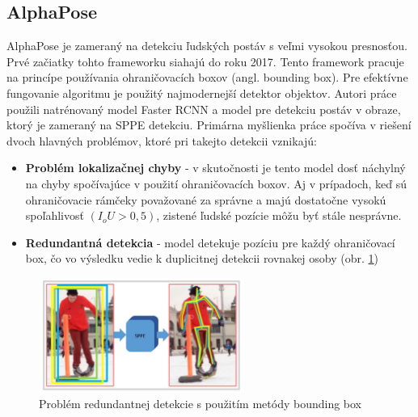 \documentclass[slovak,master,dept460,male,cpp,cpdeclaration]{diploma}
\begin{document}
\subsection{AlphaPose}
AlphaPose\cite{fang2017rmpe} je zameraný na detekciu ľudských postáv s veľmi vysokou presnosťou. Prvé začiatky tohto frameworku siahajú do roku 2017. Tento framework pracuje na princípe používania ohraničovacích boxov (angl. bounding box). Pre efektívne fungovanie algoritmu je použitý najmodernejší detektor objektov. Autori práce použili natrénovaný model Faster RCNN\cite{ren2015faster} a model pre detekciu postáv v obraze\cite{newell2016stacked}, ktorý je zameraný na SPPE detekciu. Primárna myšlienka práce spočíva v riešení dvoch hlavných problémov, ktoré pri takejto detekcii vznikajú:
\begin{itemize}
\item \textbf{Problém lokalizačnej chyby} - v skutočnosti je tento model dosť náchylný na chyby spočívajúce v použití ohraničovacích boxov. Aj v prípadoch, keď sú ohraničovacie rámčeky považované za správne a majú dostatočne vysokú spoľahlivosť \textit{$(I_oU > 0,5)$}, zistené ľudské pozície môžu byť stále nesprávne. 
\item \textbf{Redundantná detekcia} - model detekuje pozíciu pre každý ohraničovací box, čo vo výsledku vedie k duplicitnej detekcii rovnakej osoby (obr. \ref{fig:alphaPoseRedundant})
\end{itemize}

\begin{figure}[H]
	\centering
	\includegraphics[width=0.6\textwidth]{Figures/alphaPoseRedundant.png}
	\caption{Problém redundantnej detekcie s použitím metódy bounding box\cite{fang2017rmpe}}
	\label{fig:alphaPoseRedundant}
\end{figure}
\end{document}
